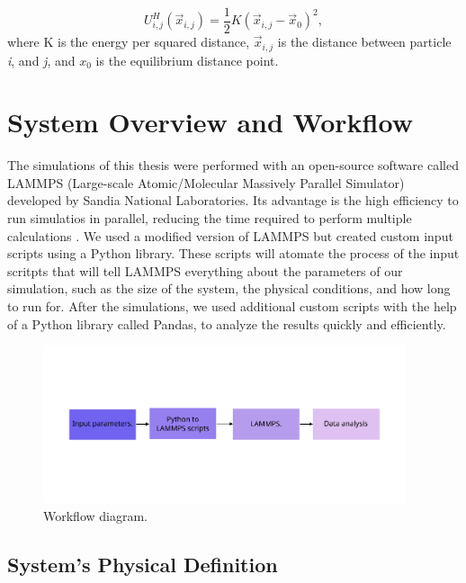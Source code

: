 \begin{equation}
  U^{H}_{i,j}(\vec{x}_{i,j}) = \frac{1}{2}K(\vec{x}_{i,j} - \vec{x}_0)^2,
\end{equation}
where K is the energy per squared distance, $\vec{x}_{i,j}$ is the distance between particle \textit{i}, and \textit{j}, and $x_0$ is the equilibrium distance point.

\section{System Overview and Workflow}

The simulations of this thesis were performed with an open-source software called LAMMPS (Large-scale Atomic/Molecular Massively Parallel Simulator) developed by Sandia National Laboratories. Its advantage is the high efficiency to run simulatios in parallel, reducing the time required to perform multiple calculations \cite{LAMMPS}. We used a modified version of LAMMPS but created custom input scripts using a Python library. These scripts will atomate the process of the input scritpts that will tell LAMMPS everything about the parameters of our simulation, such as the size of the system, the physical conditions, and how long to run for. After the simulations, we used additional custom scripts with the help of a Python library called Pandas, to analyze the results quickly and efficiently.

\begin{figure}[h]
  \begin{center}
    \includegraphics[width=0.95\textwidth]{figures/workflow.pdf}
  \end{center}
  \caption[Workflow diagram.]{Workflow diagram.}\label{fig:workflow}
\end{figure}

\subsection{System's Physical Definition}

